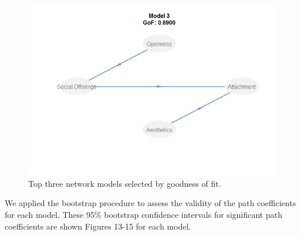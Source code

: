 \documentclass[11pt]{asaproc}
\begin{document}
\begin{figure}[H]
\begin{framed}
\hspace{0.5cm}
\begin{minipage}[b]{0.45\linewidth}
\centering
\includegraphics[width=\textwidth]{Mod3GoF.png}
\end{minipage}
\hspace{0.5cm}
\begin{minipage}[b]{0.45\linewidth}
\centering
\caption{Top three network models selected by goodness of fit.}
\label{fig:PLSPMtop3}
\end{minipage}
\end{framed}
\end{figure}


We applied the bootstrap procedure to assess the validity of the path
coefficients for each model. These 95\% bootstrap confidence intervals
for significant path coefficients are shown Figures
13-15 for each model. 
\end{document}

